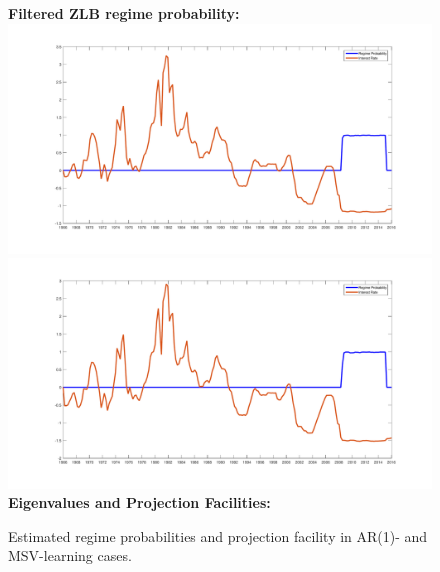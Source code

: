 \documentclass[12pt,reqno]{article}
\numberwithin{equation}{section}
\begin{document}
\begin{figure}[H]
\label{sw_regime_prob}
\caption{Estimated regime probabilities and projection facility in AR(1)- and MSV-learning cases.} 
\vspace{5 mm}
\textbf{Filtered ZLB regime probability:}\\

\includegraphics[scale=0.23]{sw_ar1_regimeProb.pdf}
\includegraphics[scale=0.23]{sw_msv_regimeProb.pdf}\\

\textbf{Eigenvalues and Projection Facilities:}\\


\end{figure}
\end{document}
